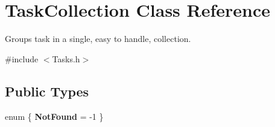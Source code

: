 \hypertarget{class_task_collection}{\section{Task\-Collection Class Reference}
\label{class_task_collection}
}


Groups task in a single, easy to handle, collection.  




{\ttfamily \#include $<$Tasks.\-h$>$}

\subsection*{Public Types}
\begin{DoxyCompactItemize}
\item 
enum \{ {\bfseries Not\-Found} = -\/1
 \}
\end{DoxyCompactItemize}
